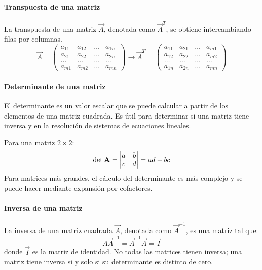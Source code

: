 \paragraph{Transpuesta de una matriz}
La transpuesta de una matriz $\vec{A}$, denotada como $\vec{A}^T$, se obtiene intercambiando filas por columnas.
$$\vec{A} = \begin{pmatrix}
a_{11} & a_{12} & \ldots & a_{1n} \\
a_{21} & a_{22} & \ldots & a_{2n} \\
\ldots & \ldots & \ldots & \ldots \\
a_{m1} & a_{m2} & \ldots & a_{mn} 
\end{pmatrix} \rightarrow \vec{A}^T = \begin{pmatrix}
a_{11} & a_{21} & \ldots & a_{m1} \\
a_{12} & a_{22} & \ldots & a_{m2} \\
\ldots & \ldots & \ldots & \ldots \\
a_{1n} & a_{2n} & \ldots & a_{mn} 
\end{pmatrix}$$

\paragraph{Determinante de una matriz}
El determinante es un valor escalar que se puede calcular a partir de los elementos de una matriz cuadrada. Es útil para determinar si una matriz tiene inversa y en la resolución de sistemas de ecuaciones lineales.

Para una matriz $2 \times 2$:
\begin{align}
\det \vec{A}
=
\begin{vmatrix}
a & b \\ 
c & d
\end{vmatrix}
=ad - bc\notag
\end{align}
Para matrices más grandes, el cálculo del determinante es más complejo y se puede hacer mediante expansión por cofactores.

\paragraph{Inversa de una matriz}
La inversa de una matriz cuadrada $\vec{A}$, denotada como $\vec{A}^{-1}$, es una matriz tal que:
$$\vec{AA}^{-1} = \vec{A}^{-1} \vec{A} = \vec{I}$$
donde $\vec{I}$ es la matriz de identidad. No todas las matrices tienen inversa; una matriz tiene inversa si y solo si su determinante es distinto de cero.

